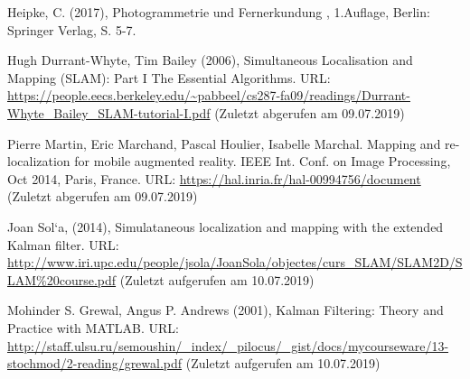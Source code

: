 \documentclass[12pt,oneside]{scrreprt}
\begin{document}
  \begin{thebibliography}{10}
  
  
     Heipke, C. (2017), \glqq Photogrammetrie und Fernerkundung \grqq, 1.Auflage, Berlin: Springer Verlag, S. 5-7.
    
     Hugh Durrant-Whyte, Tim Bailey (2006), Simultaneous Localisation and Mapping (SLAM): Part I The Essential Algorithms. URL: \url{https://people.eecs.berkeley.edu/~pabbeel/cs287-fa09/readings/Durrant-Whyte_Bailey_SLAM-tutorial-I.pdf} (Zuletzt abgerufen am 09.07.2019)
    

 Pierre Martin, Eric Marchand, Pascal Houlier, Isabelle Marchal. Mapping and re-localization for mobile augmented reality. IEEE Int. Conf. on Image Processing, Oct 2014, Paris, France.
URL: \url{https://hal.inria.fr/hal-00994756/document} (Zuletzt abgerufen am 09.07.2019) 

 Joan Sol`a, (2014), Simulataneous localization and mapping with the extended Kalman filter. URL: \url{http://www.iri.upc.edu/people/jsola/JoanSola/objectes/curs_SLAM/SLAM2D/SLAM\%20course.pdf} (Zuletzt aufgerufen am 10.07.2019)
    
     Mohinder S. Grewal, Angus P. Andrews (2001), Kalman Filtering: Theory and Practice with MATLAB. URL: \url{http://staff.ulsu.ru/semoushin/_index/_pilocus/_gist/docs/mycourseware/13-stochmod/2-reading/grewal.pdf} (Zuletzt aufgerufen am 10.07.2019)


	\end{thebibliography}  
  \newpage
  
  \listoffigures
  \newpage
 
  
\end{document}
